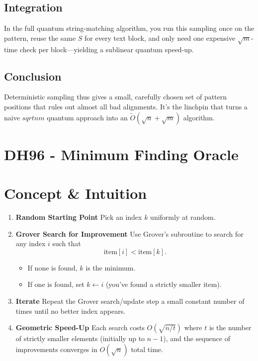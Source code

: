 \documentclass[11pt]{article}
\begin{document}
\subsection*{Integration}
In the full quantum string-matching algorithm, you run this sampling once on the pattern, reuse the same \(S\) for every text block, and only need one expensive \(\sqrt{m}\)-time check per block—yielding a sublinear quantum speed-up.

\subsection*{Conclusion}
Deterministic sampling thus gives a small, carefully chosen set of pattern positions that rules out almost all bad alignments. It's the linchpin that turns a naive \(sqrt{nm}\) quantum approach into an \(\widetilde{O}(\sqrt{n} + \sqrt{m})\) algorithm.

\section*{DH96 - Minimum Finding Oracle}
\section*{Concept \& Intuition}
\begin{enumerate}
  \item \textbf{Random Starting Point}
        Pick an index \(k\) uniformly at random.
  \item \textbf{Grover Search for Improvement}
        Use Grover's subroutine to search for any index \(i\) such that
        \[
          \text{item}[i] < \text{item}[k].
        \]
        \begin{itemize}
          \item If none is found, \(k\) is the minimum.
          \item If one is found, set \(k \leftarrow i\) (you've found a strictly smaller item).
        \end{itemize}
  \item \textbf{Iterate}
        Repeat the Grover search/update step a small constant number of times until no better index appears.
  \item \textbf{Geometric Speed-Up}
        Each search costs \(O(\sqrt{n/t})\) where \(t\) is the number of strictly smaller elements (initially up to \(n-1\)), and the sequence of improvements converges in \(O(\sqrt{n})\) total time.
\end{enumerate}
\end{document}
